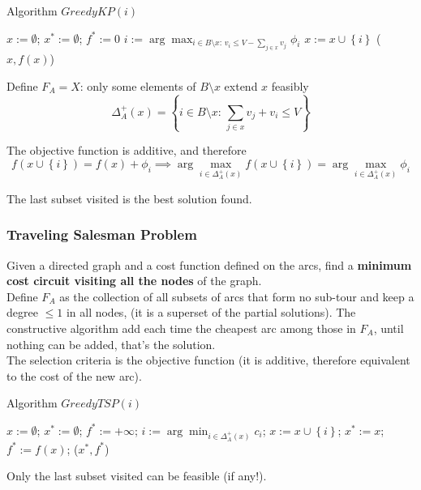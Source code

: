 \documentclass[11pt]{article}
\begin{document}
	\begin{algorithm}
		\caption{Algorithm $GreedyKP(i)$}
		\begin{algorithmic}
			\STATE $x := \emptyset$; $x^\ast := \emptyset$; $f^\ast := 0$
				\STATE $i := \arg \max_{i \in B \setminus x : \, v_i \leq V - \sum_{j \in x} v_j} \phi_i$
				\STATE $x := x \cup \left\{i\right\}$
			\ENDWHILE
			\RETURN ($x, f(x)$)
		\end{algorithmic}
	\end{algorithm}
	
	Define $F_A = X$: only some elements of $B \setminus x$ extend $x$ feasibly
	$$ \Delta_A^+ (x) = \left\{i \in B \setminus x: \, \sum_{j \in x} v_j + v_i \leq V \right\} $$
	
	The objective function is additive, and therefore
	$$ f\left(x \cup \left\{i\right\}\right) = f(x) + \phi_i \implies \arg \max_{i \in \Delta_A^+ (x)} f\left(x \cup \left\{i\right\}\right) = \arg \max_{i \in \Delta_A^+ (x)} \phi_i $$
	
	The last subset visited is the best solution found.\\
	
	\newpage
	
	\subsubsection{Traveling Salesman Problem}
	Given a directed graph and a cost function defined on the arcs, find a \textbf{minimum cost circuit visiting all the nodes} of the graph.\\
	
	Define $F_A$ as the collection of all subsets of arcs that form no sub-tour and keep a degree $\leq 1$ in all nodes, (it is a superset of the partial solutions). The constructive algorithm add each time the cheapest arc among those in $F_A$, until nothing can be added, that's the solution.\\
	
	The selection criteria is the objective function (it is additive, therefore equivalent to the cost of the new arc).
	
	\begin{algorithm}
		\caption{Algorithm $GreedyTSP(i)$}
		\begin{algorithmic}
			\STATE $x := \emptyset$; $x^\ast := \emptyset$;
			\STATE $f^\ast := + \infty$;
			\WHILE{$\Delta_A^+(x) \neq \emptyset$}
				\STATE $i := \arg \min_{i \in \Delta_A^+ (x)} c_i$;
				\STATE $x := x \cup \left\{i\right\}$;
			\ENDWHILE
			\IF{$x \in X$}
				\STATE $x^\ast := x$; $f^\ast := f(x)$;
			\ENDIF
			\RETURN ($x^\ast, f^\ast$)
		\end{algorithmic}
	\end{algorithm}
	Only the last subset visited can be feasible (if any!).\\
	
\end{document}

